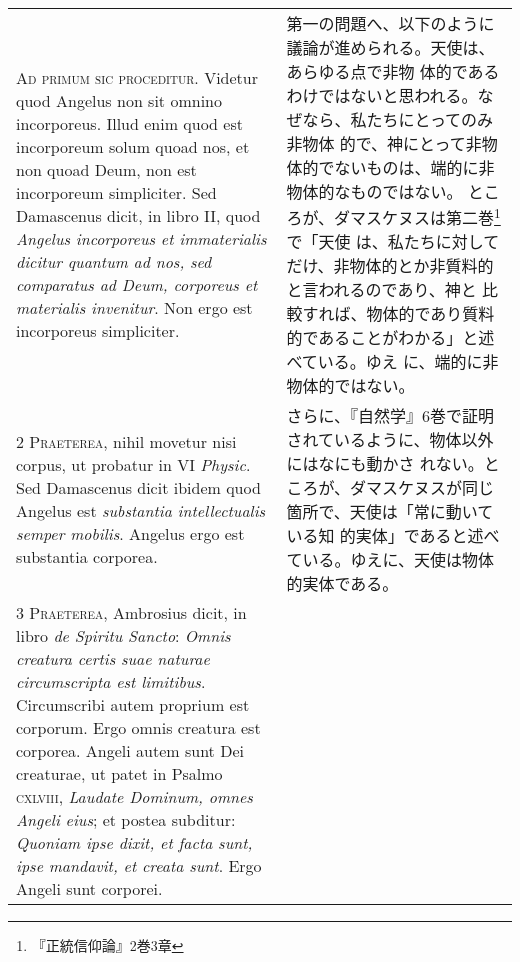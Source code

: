 \documentclass[10pt]{jsarticle} %
\begin{document}
\begin{longtable}{p{21em}p{21em}}


{\huge A}{\scshape d primum sic proceditur}. Videtur quod Angelus non
sit omnino incorporeus. Illud enim quod est incorporeum solum quoad nos,
et non quoad Deum, non est incorporeum simpliciter. Sed Damascenus
dicit, in libro II, quod {\itshape Angelus incorporeus et immaterialis
dicitur quantum ad nos, sed comparatus ad Deum, corporeus et materialis
invenitur}. Non ergo est incorporeus simpliciter.

&

 第一の問題へ、以下のように議論が進められる。天使は、あらゆる点で非物
 体的であるわけではないと思われる。なぜなら、私たちにとってのみ非物体
 的で、神にとって非物体的でないものは、端的に非物体的なものではない。
 ところが、ダマスケヌスは第二巻\footnote{『正統信仰論』2巻3章}で「天使
 は、私たちに対してだけ、非物体的とか非質料的と言われるのであり、神と
 比較すれば、物体的であり質料的であることがわかる」と述べている。ゆえ
 に、端的に非物体的ではない。

\\


{\scshape 2 Praeterea}, nihil movetur nisi corpus, ut probatur in VI
{\itshape Physic}. Sed Damascenus dicit ibidem quod Angelus est
{\itshape substantia intellectualis semper mobilis}. Angelus ergo est
substantia corporea.


&

 さらに、『自然学』6巻で証明されているように、物体以外にはなにも動かさ
 れない。ところが、ダマスケヌスが同じ箇所で、天使は「常に動いている知
 的実体」であると述べている。ゆえに、天使は物体的実体である。

\\


{\scshape 3 Praeterea}, Ambrosius dicit, in libro {\itshape de Spiritu
Sancto}: {\itshape Omnis creatura certis suae naturae circumscripta
est limitibus}. Circumscribi autem proprium est corporum. Ergo omnis
creatura est corporea. Angeli autem sunt Dei creaturae, ut patet in
Psalmo {\scshape cxlviii}, {\itshape Laudate Dominum, omnes Angeli
eius}; et postea subditur: {\itshape Quoniam ipse dixit, et facta
sunt, ipse mandavit, et creata sunt}. Ergo Angeli sunt corporei.


&


\end{longtable}
\end{document}

